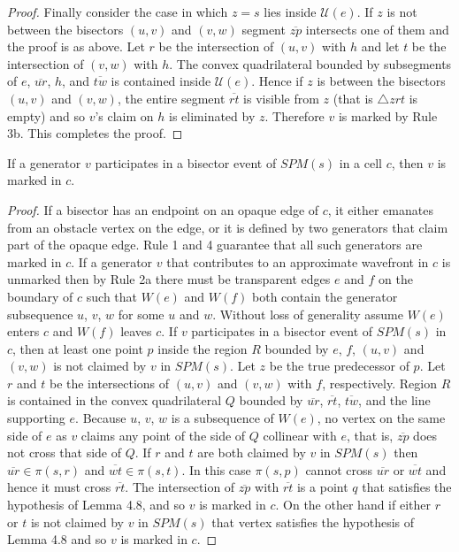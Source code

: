 \begin{proof}
	Finally consider the case in which $z=s$ lies inside $\mathcal{U}(e)$. If
	$z$ is not between the bisectors $(u,v)$ and $(v,w)$ segment
	$\overline{zp}$ intersects one of them and the proof is as above. Let $r$
	be the intersection of $(u,v)$ with $h$ and let $t$ be the intersection
	of $(v,w)$ with $h$. The convex quadrilateral bounded by subsegments of
	$e$, $\overline{ur}$, $h$, and $\overline{tw}$ is contained inside
	$\mathcal{U}(e)$. Hence if $z$ is between the bisectors $(u,v)$ and
	$(v,w)$, the entire segment $\overline{rt}$ is visible from $z$ (that is
	$\bigtriangleup zrt$ is empty) and so $v$'s claim on $h$ is eliminated by
	$z$. Therefore $v$ is marked by Rule 3b. This completes the proof.

\end{proof}
\begin{Lemma}\label{lemma:4.9HershbergerS99}
	If a generator $v$ participates in a bisector event of $SPM(s)$ in a cell
	$c$, then $v$ is marked in $c$.
\end{Lemma}
\begin{proof}
	If a bisector has an endpoint on an opaque edge of $c$, it either
	emanates from an obstacle vertex on the edge, or it is defined by two
	generators that claim part of the opaque edge. Rule 1 and 4 guarantee
	that all such generators are marked in $c$.
	If a generator $v$ that contributes to an approximate wavefront in $c$ is
	unmarked then by Rule 2a there must be transparent edges $e$ and $f$ on
	the boundary of $c$ such that $W(e)$ and $W(f)$ both contain the
	generator subsequence $u$, $v$, $w$ for some $u$ and $w$.
	Without loss of generality assume $W(e)$ enters $c$ and $W(f)$ leaves
	$c$. If $v$ participates in a bisector event of $SPM(s)$ in $c$, then at
	least one point $p$ inside the region $R$ bounded by $e$, $f$, $(u,v)$
	and $(v,w)$ is not claimed by $v$ in $SPM(s)$. Let $z$ be the true
	predecessor of $p$. Let $r$ and $t$ be the intersections of $(u,v)$ and
	$(v,w)$ with $f$, respectively. Region $R$ is contained in the convex
	quadrilateral $Q$ bounded by $\overline{ur}$, $\overline{rt}$,
	$\overline{tw}$, and the line supporting $e$. Because $u$, $v$, $w$ is a
	subsequence of $W(e)$, no vertex on the same side of $e$ as $v$ claims
	any point of the side of $Q$ collinear with $e$, that is, $\overline{zp}$
	does not cross that side of $Q$. If $r$ and $t$ are both claimed by $v$
	in $SPM(s)$ then $\overline{ur}\in \pi(s,r)$ and $\overline{wt}\in
	\pi(s,t)$. In this case $\pi(s,p)$ cannot cross $\overline{ur}$ or
	$\overline{wt}$ and hence it
	must cross $\overline{rt}$. The intersection of $\overline{zp}$ with
	$\overline{rt}$ is a point $q$ that satisfies the hypothesis of Lemma 4.8,
	and so $v$ is marked in $c$. On the other hand if either $r$ or $t$ is not
	claimed by $v$ in $SPM(s)$ that vertex satisfies the hypothesis of Lemma 4.8
	and so $v$ is marked in $c$.
\end{proof}

